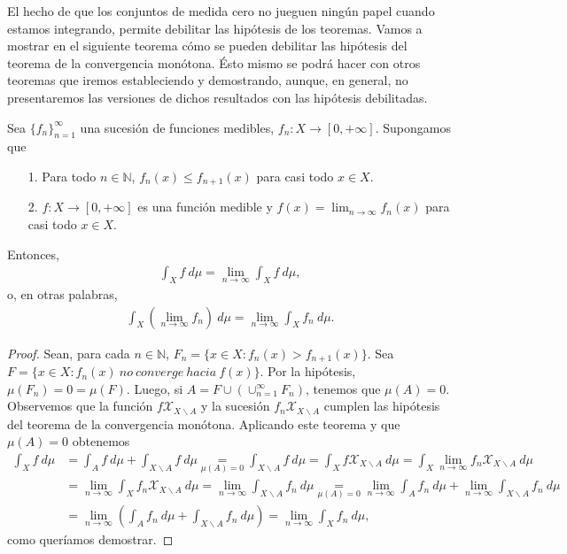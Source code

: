 El hecho de que los conjuntos de medida cero no jueguen ningún papel cuando estamos integrando, permite debilitar las hipótesis de los teoremas. Vamos a mostrar en el siguiente teorema cómo se pueden debilitar las hipótesis del teorema de la convergencia monótona. Ésto mismo se podrá hacer con otros teoremas que iremos estableciendo y demostrando, aunque, en general, no presentaremos las versiones de dichos resultados con las hipótesis debilitadas.

\begin{teo}
    Sea $\{f_n\}_{n=1}^{\infty}$ una sucesión de funciones medibles, $f_n: X \longrightarrow [0,+\infty]$. Supongamos que
    \begin{enumerate}
        \item[1.] Para todo $n \in \mathbb{N}$, $f_n(x) \leq f_{n+1}(x)$ para casi todo $x \in X$.
        \item[2.] $f: X \longrightarrow [0,+\infty]$ es una función medible y $f(x) = \lim_{n \to \infty}{f_n(x)}$ para casi todo $x \in X$.
    \end{enumerate}
    Entonces,
    \begin{align*}
        \int_{X}{f \ d\mu} = \lim_{n \to \infty}{\int_{X}{f \ d\mu}},
    \end{align*}
    o, en otras palabras,
    \begin{align*}
        \int_{X}{\left( \lim_{n \to \infty}{f_n}\right) \ d\mu} = \lim_{n \to \infty}{\int_{X}{f_n \ d\mu}}.
    \end{align*}
\end{teo}

\begin{proof}
    Sean, para cada $n \in \mathbb{N}$, $F_n = \{ x \in X : f_n(x) > f_{n+1}(x) \}$. Sea $F = \{ x \in X : f_n(x) \ no \ converge \ hacia \ f(x)\}$. Por la hipótesis, $\mu(F_n) = 0 = \mu(F)$. Luego, si $A = F \cup (\cup_{n=1}^{\infty}{F_n})$, tenemos que $\mu(A) = 0$. Observemos que la función $f \mathcal{X}_{X \backslash A}$ y la sucesión $f_n \mathcal{X}_{X \backslash A}$ cumplen las hipótesis del teorema de la convergencia monótona. Aplicando este teorema y que $\mu(A) = 0$ obtenemos
    \begin{align*}
        \int_{X}{f \ d\mu} & = \int_{A}{f \ d\mu} + \int_{X \backslash A}{f \ d\mu} \underset{\mu(A) = 0}{=} \int_{X \backslash A}{f \ d\mu} = \int_{X}{f \mathcal{X}_{X \backslash A} \ d\mu} = \int_{X}{\lim_{n \to \infty}{f_n}\mathcal{X}_{X \backslash A} \ d\mu}                     \\
                           & = \lim_{n \to \infty}{\int_{X}{f_n \mathcal{X}_{X \backslash A} \ d\mu}} = \lim_{n \to \infty}{\int_{X \backslash A}{f_n \ d\mu}} \underset{\mu(A) = 0}{=} \lim_{n \to \infty}{\int_{A}{f_n \ d\mu}} + \lim_{n \to \infty}{\int_{X \backslash A}{f_n \ d\mu}} \\
                           & = \lim_{n \to \infty}{\left(\int_{A}{f_n \ d\mu} + \int_{X \backslash A}{f_n \ d\mu}\right)} = \lim_{n \to \infty}{\int_{X}{f_n \ d\mu}},
    \end{align*}
    como queríamos demostrar.
\end{proof}

